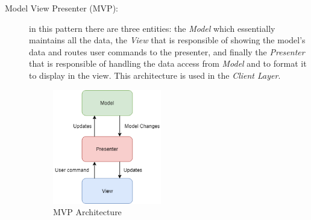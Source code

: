 \documentclass[a4paper]{article}
\begin{document}
\begin{description}
        \newpage
        \item[Model View Presenter (MVP):] in this pattern there are three entities: the \textit{Model} which essentially maintains all the data, the \textit{View} that is responsible of showing the model's data and routes user commands to the presenter, and finally the \textit{Presenter} that is responsible of handling the data access from \textit{Model} and to format it to display in the view.
        This architecture is used in the \textit{Client Layer}.
        \begin{figure}[!hb]
            \centering
            \includegraphics[height=50mm, keepaspectratio]{DD/images/mvp.png}
            \caption{MVP Architecture}
            \label{fig:mvp}
        \end{figure}
    \end{description}
\end{document}
